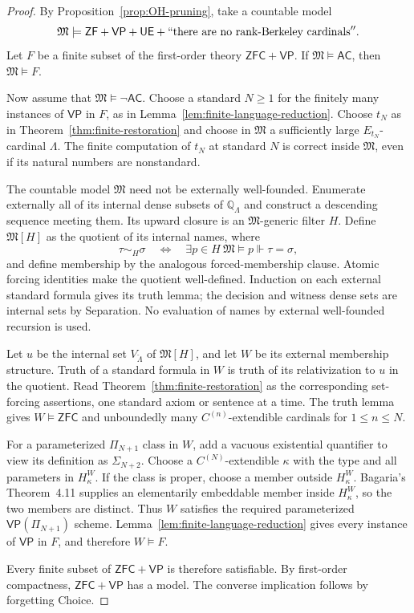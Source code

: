 \documentclass[11pt,a4paper]{amsart}
\newcommand{\VP}{\mathsf{VP}}
\newcommand{\AC}{\mathsf{AC}}
\newcommand{\ZF}{\mathsf{ZF}}
\newcommand{\ZFC}{\mathsf{ZFC}}
\newcommand{\UE}{\mathsf{UE}}
\theoremstyle{plain}
\theoremstyle{definition}
\theoremstyle{remark}
\begin{document}
\begin{proof}
By Proposition~\ref{prop:OH-pruning}, take a countable model
\[
\mathfrak M\models\ZF+\VP+\UE+``\text{there are no rank-Berkeley cardinals}''.
\]
Let $F$ be a finite subset of the first-order theory $\ZFC+\VP$.  If $\mathfrak M\models\AC$, then $\mathfrak M\models F$.

Now assume that $\mathfrak M\models\neg\AC$.
Choose a standard $N\geq1$ for the finitely many instances of $\VP$
in $F$, as in Lemma~\ref{lem:finite-language-reduction}.
Choose $t_N$ as in Theorem~\ref{thm:finite-restoration} and choose
in $\mathfrak M$ a sufficiently large $E_{t_N}$-cardinal $\Lambda$.
The finite computation of $t_N$ at standard $N$ is correct inside
$\mathfrak M$, even if its natural numbers are nonstandard.

The countable model $\mathfrak M$ need not be externally well-founded.
Enumerate externally all of its internal dense subsets of
$\mathbb Q_\Lambda$ and construct a descending sequence meeting them.
Its upward closure is an $\mathfrak M$-generic filter $H$.
Define $\mathfrak M[H]$ as the quotient of its internal names, where
\[
\tau\sim_H\sigma\quad\Longleftrightarrow\quad
\exists p\in H\ \mathfrak M\models p\Vdash\tau=\sigma,
\]
and define membership by the analogous forced-membership clause.
Atomic forcing identities make the quotient well-defined.
Induction on each external standard formula gives its truth lemma;
the decision and witness dense sets are internal sets by Separation.
No evaluation of names by external well-founded recursion is used.

Let $u$ be the internal set $V_{\check\Lambda}$ of
$\mathfrak M[H]$, and let $W$ be its external membership structure.
Truth of a standard formula in $W$ is truth of its relativization
to $u$ in the quotient.  Read Theorem~\ref{thm:finite-restoration}
as the corresponding set-forcing assertions, one standard axiom
or sentence at a time.  The truth lemma gives $W\models\ZFC$
and unboundedly many $C^{(n)}$-extendible cardinals for
$1\leq n\leq N$.

For a parameterized $\Pi_{N+1}$ class in $W$, add a vacuous
existential quantifier to view its definition as $\Sigma_{N+2}$.
Choose a $C^{(N)}$-extendible $\kappa$ with the type and all
parameters in $H_\kappa^W$.  If the class is proper, choose a
member outside $H_\kappa^W$.  Bagaria's Theorem~4.11
\cite{BagariaCn} supplies an elementarily embeddable member inside
$H_\kappa^W$, so the two members are distinct.
Thus $W$ satisfies the required parameterized
$\VP(\Pi_{N+1})$ scheme.  Lemma~\ref{lem:finite-language-reduction}
gives every instance of $\VP$ in $F$, and therefore $W\models F$.

Every finite subset of $\ZFC+\VP$ is therefore satisfiable.  By first-order compactness, $\ZFC+\VP$ has a model.  The converse implication follows by forgetting Choice.
\end{proof}
\end{document}
